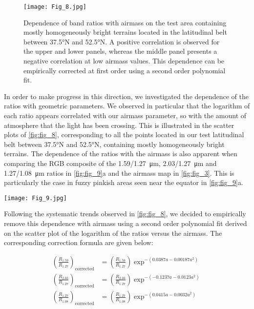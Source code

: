 \documentclass[preprint,twocolumn,5p,authoryear,compress,colorlinks=true]{elsarticle}
\newcommand{\figref}[1]{\autoref{fig:#1}}
\begin{document}
{\begin{figure}[!ht]
 \texttt{[image: Fig\_8.jpg]}
 \caption{Dependence of band ratios with airmass on the test area containing mostly homogeneously bright terrains located in the latitudinal belt between \ang{37.5}N and \ang{52.5}N. A positive correlation is observed for the upper and lower panels, whereas the middle panel presents a negative correlation at low airmass values.  This dependence can be empirically corrected at first order using a second order polynomial fit.}
 \label{fig:fig_8}
\end{figure}

In order to make progress in this direction, we investigated the dependence of the ratios with geometric parameters. We observed in particular that the logarithm of each ratio appears correlated with our airmass parameter, so with the amount of atmosphere that the light has been crossing. This is illustrated in the scatter plots of \figref{fig_8}, corresponding to all the points located in our test latitudinal belt between \ang{37.5}N and \ang{52.5}N, containing mostly homogeneously bright terrains. The dependence of the ratios with the airmass is also apparent when comparing the RGB composite of the \SI{1.59/1.27}{\um}, \SI{2.03/1.27}{\um} and \SI{1.27/1.08}{\um} ratios in \figref{fig_9}a and the airmass map in \figref{fig_3}. This is particularly the case in fuzzy pinkish areas seen near the equator in \figref{fig_9}a.

\begin{figure*}[!ht]
 \texttt{[image: Fig\_9.jpg]}
 \caption{(a) RGB color map with the red, green and blue channels controlled by the \SI{1.59/1.27}{\um}, \SI{2.03/1.27}{\um} and \SI{1.27/1.08}{\um} ratios respectively. (b) Same mosaic after the empirical correction of the airmass dependence (equations \eqref{eq:3}, \eqref{eq:4} and \eqref{eq:5}). The correction decreases the contrast at the seams due to the atmosphere at the equator and near the poles. The white rectangle shows the location of the zoom on the Huygens landing site displayed in \figref{fig_11}}
 \label{fig:fig_9}
\end{figure*}

Following the systematic trends observed in \figref{fig_8}, we decided to empirically remove this dependence with airmass using a second order polynomial fit derived on the scatter plot of the logarithm of the ratios versus the airmass. The corresponding correction formula are given below:

\begin{align}
\label{eq:3}
    \left( \frac{R_{1.59}}{R_{1.27}} \right)_\textrm{corrected} &= 
    \left( \frac{R_{1.59}}{R_{1.27}} \right) \exp^{
        -\left( 0.0387 a - 0.00187 a^2\right)
    }
\\
\label{eq:4}
    \left( \frac{R_{2.03}}{R_{1.27}} \right)_\textrm{corrected} &= 
    \left( \frac{R_{2.03}}{R_{1.27}} \right) \exp^{
        -\left( -0.1237 a - 0.0123 a^2\right)
    }
\\
\label{eq:5}
    \left( \frac{R_{1.27}}{R_{1.08}} \right)_\textrm{corrected} &= 
    \left( \frac{R_{1.27}}{R_{1.08}} \right) \exp^{
        -\left( 0.0415 a - 0.0032 a^2\right)
    }
\end{align}

}
\end{document}
